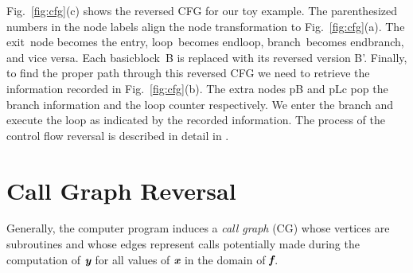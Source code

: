 \documentclass{book}
\newcommand{\entry}{entry}
\newcommand{\exit}{exit}
\newcommand{\Loop}{loop}
\newcommand{\EndLoop}{endloop}
\newcommand{\branch}{branch}
\newcommand{\EndBranch}{endbranch}
\newcommand{\basicblock}{basicblock}
\newcommand{\bmf}{\mbox{\bf\em f}}
\newcommand{\bmx}{\mbox{\bf\em x}}
\newcommand{\bmy}{\mbox{\bf\em y}}
\newcommand{\reffig}[1]{{Fig.~\ref{#1}}}
\begin{document}
\reffig{fig:cfg}(c) shows the reversed CFG for our toy example. 
The parenthesized numbers in the node labels align the 
node transformation to \reffig{fig:cfg}(a). 
The \exit\ node becomes 
the \entry, \Loop\ becomes \EndLoop, \branch\ becomes \EndBranch, and vice versa. 
Each \basicblock\  B is replaced with its reversed version B'.  
Finally, to find the proper path through this reversed CFG we need to retrieve 
the information recorded in  \reffig{fig:cfg}(b). The extra nodes pB and pLc 
pop the branch information and the loop counter respectively.  
We enter the branch and execute the loop as indicated by the recorded information. 
The process of the control flow reversal is described in detail in 
\cite{NULF04CFR}. 

\section{Call Graph Reversal} \label{sec:cgReversal}

Generally, the computer program 
induces a {\em call graph} (CG) \cite{ASU86}
whose vertices are subroutines and whose edges 
represent calls potentially made during the computation of $\bmy$ for all 
values of $\bmx$ in the domain of $\bmf$.
\end{document}
